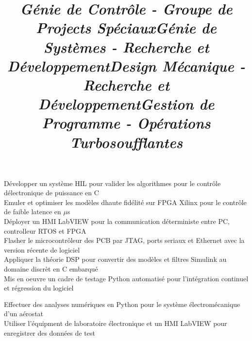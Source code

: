 \documentclass[mm]{res}
\begin{document}
\begin{resume}
\title{\textsl{G\'enie de Contr\^ole - Groupe de Projects Sp\'eciaux}}
\begin{position}
\tb D\'evelopper un syst\`eme HIL pour valider les algorithmes pour le contr\^ole d\textquotesingle \'electronique de puissance en C\\
\tb Emuler et optimiser les mod\`eles d\textquotesingle haute fid\'elit\'e sur FPGA Xilinx pour le contr\^ole de faible latence en $\mu$s\\
\tb D\'eployer un HMI LabVIEW pour la communication d\'eterministe entre PC, controlleur RTOS et FPGA\\
\tb Flasher le microcontr\^oleur des PCB par JTAG, ports seriaux et Ethernet avec la version r\'ecente de logiciel \\
\tb Appliquer la th\'eorie DSP pour convertir des mod\`eles et filtres Simulink au domaine discr\`et en C embarqu\'e\\
\tb Mis en oeuvre un cadre de testage Python automatis\'e pour l'int\'egration continuel et r\'egression du logiciel
\end{position}

\title{\textsl{G\'enie de Syst\`emes - Recherche et D\'eveloppement}}
\begin{position}
\tb Effectuer des analyses num\'eriques en Python pour le syst\`eme \'electrom\'ecanique d'un a\'erostat\\
\tb Utiliser l'\'equipment de laboratoire \'electronique et un HMI LabVIEW pour enregistrer des donn\'ees de test
\end{position}

\title{\textsl{Design M\'ecanique - Recherche et D\'eveloppement}}
\begin{position}
\end{position}

\title{\textsl{Gestion de Programme - Op\'erations Turbosoufflantes}}
\begin{position}
\end{position}


\end{resume}
\end{document}
